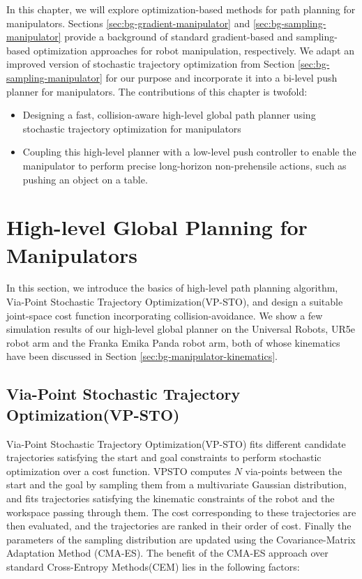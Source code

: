 In this chapter, we will explore optimization-based methods for path planning for manipulators. Sections \ref{sec:bg-gradient-manipulator} and \ref{sec:bg-sampling-manipulator} provide a background of standard gradient-based and sampling-based optimization approaches for robot manipulation, respectively. We adapt an improved version of stochastic trajectory optimization from Section \ref{sec:bg-sampling-manipulator} for our purpose and incorporate it into a bi-level push planner for manipulators. The contributions of this chapter is twofold:

\begin{itemize}
    \item Designing a fast, collision-aware high-level global path planner using stochastic trajectory optimization for manipulators
    \item Coupling this high-level planner with a low-level push controller to enable the manipulator to perform precise long-horizon non-prehensile actions, such as pushing an object on a table.
\end{itemize}

\section{High-level Global Planning for Manipulators}

In this section, we introduce the basics of high-level path planning algorithm, Via-Point Stochastic Trajectory Optimization(VP-STO)\cite{VPSTO}, and design a suitable joint-space cost function incorporating collision-avoidance. We show a few simulation results of our high-level global planner on the Universal Robots, UR5e robot arm and the Franka Emika Panda robot arm, both of whose kinematics have been discussed in Section \ref{sec:bg-manipulator-kinematics}.


\subsection{Via-Point Stochastic Trajectory Optimization(VP-STO)}

Via-Point Stochastic Trajectory Optimization(VP-STO)\cite{VPSTO} fits different candidate trajectories satisfying the start and goal constraints to perform stochastic optimization over a cost function. VPSTO computes $N$ via-points between the start and the goal by sampling them from a multivariate Gaussian distribution, and fits trajectories satisfying the kinematic constraints of the robot and the workspace passing through them. The cost corresponding to these trajectories are then evaluated, and the trajectories are ranked in their order of cost. Finally the parameters of the sampling distribution are updated using the Covariance-Matrix Adaptation Method (CMA-ES). The benefit of the CMA-ES approach over standard Cross-Entropy Methods(CEM) lies in the following factors:

